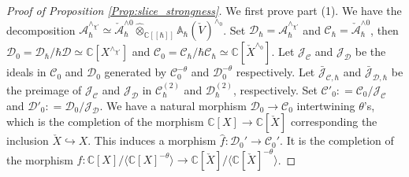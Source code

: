 \documentclass[12pt]{amsart}
\newcommand{\C}{\mathbb{C}}
\newcommand{\A}{\mathcal{A}}
\newcommand{\J}{\mathcal{J}}
\newcommand{\Weyl}{\mathbb{A}}
\newcommand{\Dcal}{\mathcal{D}}
\theoremstyle{definition}
\numberwithin{equation}{section}
\begin{document}
\begin{proof}[Proof of Proposition \ref{Prop:slice_strongness}]
  We first prove part (1). We have the decomposition $\A_\hbar^{\wedge_{\chi'}} \simeq  \check{\A}_\hbar^{\wedge 0} \widehat{\otimes}_{\C[[\hbar]]}  \Weyl_\hbar(\check{V} )^{\wedge_0}$. Set $\Dcal_\hbar = \A_\hbar^{\wedge_{\chi'}}$ and $\mathcal{C}_\hbar = \check{\A}_\hbar^{\wedge 0}$, then $\Dcal_0 = \Dcal_\hbar/\hbar\Dcal \simeq \C[X^{\wedge_{\chi'}}]$ and $\mathcal{C}_0 = \mathcal{C}_\hbar / \hbar \mathcal{C}_\hbar \simeq \C[\check{X}^{\wedge_0}]$. Let $\J_\mathcal{C}$ and $\J_\Dcal$ be the ideals in $\mathcal{C}_0$ and $\Dcal_0$ generated by $\mathcal{C}_0^{-\theta}$ and $\Dcal_0^{-\theta}$ respectively. Let $\bar{\J}_{\mathcal{C},\hbar}$ and $\bar{\J}_{\Dcal,\hbar}$ be the preimage of $\J_\mathcal{C}$ and $\J_\Dcal$ in $\mathcal{C}_\hbar^{(2)}$ and $\Dcal_\hbar^{(2)}$, respectively. Set $\mathcal{C}'_0: = \mathcal{C}_0 / \J_\mathcal{C}$ and $\Dcal'_0: = \Dcal_0 / \J_\Dcal$. We have a natural morphism $\Dcal_0 \to \mathcal{C}_0$ intertwining $\theta$'s, which is the completion of the morphism $\C[X] \to \C[\check{X}]$ corresponding the inclusion $\check{X} \hookrightarrow X$. This induces a morphism $\hat{f}: \Dcal_0' \to \mathcal{C}_0'$. It is the completion of the morphism $f: \C[X] / \langle \C[X]^{-\theta} \rangle \to \C[\check{X}] / \langle \C[\check{X}]^{-\theta} \rangle$.


\end{proof}
\end{document}
